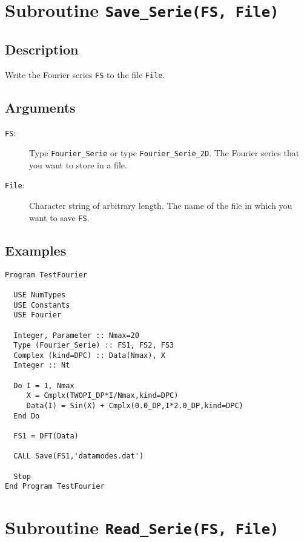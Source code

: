 \section{Subroutine \texttt{Save\_Serie(FS, File)}}

\subsection{Description}

Write the Fourier series \texttt{FS} to the file \texttt{File}.

\subsection{Arguments}

\begin{description}
\item[\texttt{FS}:] Type \texttt{Fourier\_Serie} or type
  \texttt{Fourier\_Serie\_2D}. The Fourier series that you want to
  store in a file.
\item[\texttt{File}:] Character string of arbitrary length. The name
  of the file in which you want to save \texttt{FS}.
\end{description}

\subsection{Examples}

\begin{lstlisting}[emph=Save_Serie,
                   emphstyle=\color{blue},
                   frame=trBL,
                   caption=Saving a Fourier Serie in a file.,
                   label=save_serie]
Program TestFourier

  USE NumTypes
  USE Constants
  USE Fourier

  Integer, Parameter :: Nmax=20
  Type (Fourier_Serie) :: FS1, FS2, FS3
  Complex (kind=DPC) :: Data(Nmax), X
  Integer :: Nt

  Do I = 1, Nmax
     X = Cmplx(TWOPI_DP*I/Nmax,kind=DPC)
     Data(I) = Sin(X) + Cmplx(0.0_DP,I*2.0_DP,kind=DPC)
  End Do

  FS1 = DFT(Data)

  CALL Save(FS1,'datamodes.dat')

  Stop
End Program TestFourier
\end{lstlisting}


\section{Subroutine \texttt{Read\_Serie(FS, File)}}

